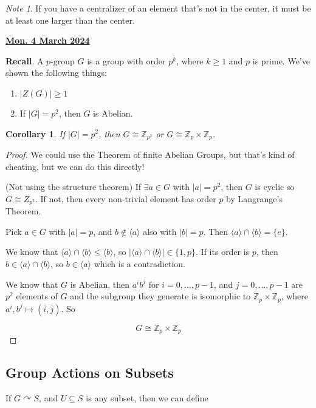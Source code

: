 \documentclass[12pt]{article}
\renewcommand{\date}[1]{\underline{\bf #1}}
\def\acts{\curvearrowright} %
\def\Z{{\mathbb Z}}
\newcommand{\lr}[1]{\langle #1 \rangle}
\newtheorem{corollary}{Corollary}
\theoremstyle{remark}
\theoremstyle{remark}
\theoremstyle{remark}
\theoremstyle{remark}
\theoremstyle{remark}
\newtheorem*{note}{Note}
\begin{document}
\begin{note}
  If you have a centralizer of an element that's not in the center, it must be
  at least one larger than the center.
\end{note}

\date {Mon. 4 March 2024}

{\bf Recall}. A $p$-group $G$ is a group with order $p^k$, where $k \ge 1$ and
$p$ is prime. We've shown the following things:

\begin{enumerate}
  \item $|Z(G)| \ge 1$
  \item If $|G| = p^2$, then $G$ is Abelian.
\end{enumerate}

\begin{corollary}
  If $|G| = p^2$, then $G \cong \Z_{p^2}$ or $G \cong \Z_p \times \Z_p$.
\end{corollary}

\begin{proof}
  We could use the Theorem of finite Abelian Groups, but that's kind
  of cheating, but we can do this directly!

  (Not using the structure theorem) If $\exists a \in G$ with $|a| = p^2$, then
  $G$ is cyclic so $G \cong Z_{p^2}$. If not, then every non-trivial element has
  order $p$ by Langrange's Theorem.

  Pick $a \in G$ with $|a| = p$, and $b \not\in \lr{a}$ also with $|b| = p$. Then
  $\lr {a} \cap \lr{b} = \{e\}$.

  We know that $\lr{a} \cap \lr{b} \le \lr{b}$, so $|\lr{a} \cap \lr{b}| \in \{1,
  p\}$. If its order is $p$, then $b \in \lr{a} \cap \lr{b}$, so $b \in \lr{a}$
  which is a contradiction.

  We know that $G$ is Abelian, then $a^i b^j$ for $i = 0, \dots, p - 1$, and $j =
  0, \dots, p - 1$ are $p^2$ elements of $G$ and the subgroup they generate is
  isomorphic to $\Z_p \times \Z_p$, where $a^i, b^j \mapsto (\bar i, \bar j)$. So

  \[
    G \cong \Z_p \times \Z_p
  \]
\end{proof}

\subsection{Group Actions on Subsets}

If $G \acts S$, and $U \subseteq S$ is any subset, then we can define
\end{document}
